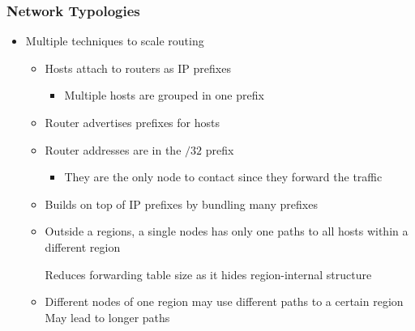 \subsubsection{Network Typologies}
\begin{itemize}
     Each computer is directly accessible via its own IP
        \begin{itemize}
            \icon Not scalable as internet grows
        \end{itemize}
    \item Multiple techniques to scale routing
        \begin{itemize}
             Bundle a bunch of devices together
            \item Hosts attach to routers as IP prefixes
                \begin{itemize}
                    \item Multiple hosts are grouped in one prefix
                \end{itemize}
            \item Router advertises prefixes for hosts
            \item Router addresses are in the $/32$ prefix
                \begin{itemize}
                    \item They are the only node to contact since they forward the traffic
                \end{itemize}
        \end{itemize}
        \begin{itemize}
             Route to region before routing to more specific prefix
            \item Builds on top of IP prefixes by bundling many prefixes
            \item Outside a regions, a single nodes has only one paths to all hosts within a different region
                \begin{itemize}
                    \ipro Reduces forwarding table size as it hides region-internal structure
                \end{itemize}
            \item Different nodes of one region may use different paths to a certain region
            \icon May lead to longer paths
        \end{itemize}
        \begin{itemize}

\end{itemize}
\end{itemize}
